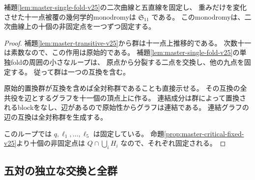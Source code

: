 \begin{proposition}[固定十一点の完全対称群]
\label{prop:master-S11-v25}
補題\ref{lem:master-single-fold-v25}の二次曲線と五直線を固定し、
重みだけを変化させた十一点被覆の幾何学的monodromyは $\mathfrak S_{11}$ である。
このmonodromyは、二次曲線上の十個の非固定点を一つずつ固定する。
\end{proposition}
\begin{proof}
補題\ref{lem:master-transitive-v25}から群は十一点上推移的である。
次数十一は素数なので、この作用は原始的である。
補題\ref{lem:master-single-fold-v25}の単独foldの周囲の小さなループは、
原点から分裂する二点を交換し、他の九点を固定する。
従って群は一つの互換を含む。

原始的置換群が互換を含めば全対称群であることも直接示せる。
その互換の全共役を辺とするグラフを十一個の頂点上に作る。
連結成分は群によって置換されるblockをなし、辺があるので原始性からグラフは連結である。
連結グラフの辺の互換は全対称群を生成する。

このループでは $q,\ell_1,\ldots,\ell_5$ は固定している。
命題\ref{prop:master-critical-fixed-v25}より十個の非固定点は
$Q\cap\bigcup_iH_i$ なので、それぞれ固定される。
\end{proof}

\subsection{五対の独立な交換と全群}

